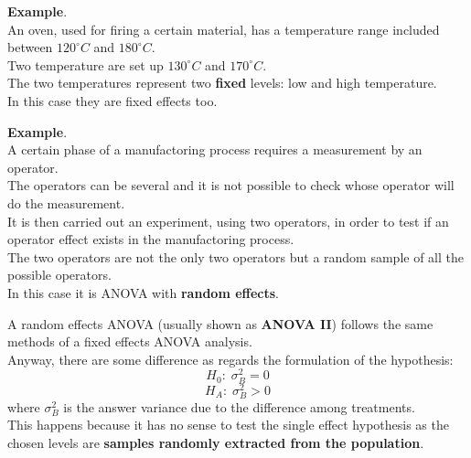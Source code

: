 \begin{frame}
  \vspace*{.5cm} 
  \textbf{Example}.\\
  \vspace*{.5cm} 
  An oven, used for firing a certain material, has a temperature range included between $120^{\circ}C$ and $180^{\circ}C$.\\
  \vspace*{.5cm} 
  Two temperature are set up $130^{\circ}C$ and $170^{\circ}C$.\\
  \vspace*{.5cm} 
  The two temperatures represent two \textbf{fixed} levels: low and high temperature.\\
  \vspace*{.5cm} 
  In this case they are fixed effects too.
\end{frame}

\begin{frame}
  \vspace*{.25cm} 
  \textbf{Example}.\\
  \vspace*{.25cm} 
  A certain phase of a manufactoring process requires a measurement by an operator.\\
  \vspace*{.25cm} 
  The operators can be several and it is not possible to check whose operator will do the measurement.\\
  \vspace*{.25cm} 
  It is then carried out an experiment, using two operators, in order to test if an operator effect exists in the manufactoring process.\\
  \vspace*{.25cm} 
  The two operators are not the only two operators but a random sample of all the possible operators.\\
  \vspace*{.25cm} 
  In this case it is ANOVA with \textbf{random effects}.
\end{frame}

\begin{frame}
  \vspace*{.25cm} 
  A random effects ANOVA (usually shown as \textbf{ANOVA II}) follows the same methods of a fixed effects ANOVA analysis.\\
  \vspace*{.25cm}
  Anyway, there are some difference as regards the formulation of the hypothesis:
  $$ H_0: \; \sigma^{2}_B = 0 $$
  $$ H_A: \; \sigma^{2}_B > 0 $$
  where $\sigma^{2}_B$ is the answer variance due to the difference among treatments.\\
  \vspace{.25cm}
  This happens because it has no sense to test the single effect hypothesis as the chosen levels are \textbf{samples randomly extracted from the population}.\\
\end{frame}

